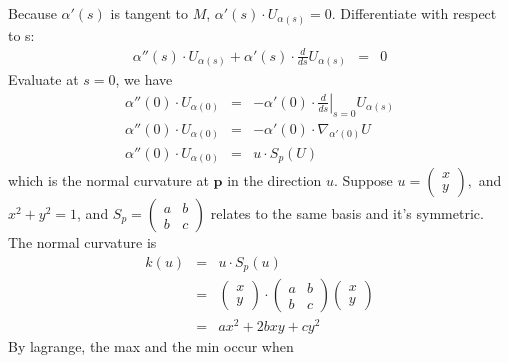 \documentclass{article}
\begin{document}
Because $\alpha' (s)$ is tangent to $M$, $\alpha' (s) \cdot U_{\alpha (s)} =
0$. Differentiate with respect to s:
\begin{eqnarray*}
  \alpha'' (s) \cdot U_{\alpha (s)} + \alpha' (s) \cdot \frac{d}{d s}
  U_{\alpha (s)} & = & 0
\end{eqnarray*}
Evaluate at $s = 0$, we have
\begin{eqnarray}
  \alpha'' (0) \cdot U_{\alpha (0)} & = & - \alpha' (0) \cdot \left.
  \frac{d}{d s} \right|_{s = 0} U_{\alpha (s)} \nonumber\\
  \alpha'' (0) \cdot U_{\alpha (0)} & = & - \alpha' (0) \cdot \nabla_{\alpha'
  (0)} U \nonumber\\
  \alpha'' (0) \cdot U_{\alpha (0)} & = & u \cdot S_p (U) 
\end{eqnarray}
which is the normal curvature at $\mathbf{p}$ in the direction $u$. Suppose $u
= \left(\begin{array}{c}
  x\\
  y
\end{array}\right),$ and $x^2 + y^2 = 1$, and $S_p = \left(\begin{array}{cc}
  a & b\\
  b & c
\end{array}\right)$ relates to the same basis and it's symmetric. The normal
curvature is
\begin{eqnarray*}
  k (u) & = & u \cdot S_p (u)\\
  & = & \left(\begin{array}{c}
    x\\
    y
  \end{array}\right) \cdot \left(\begin{array}{cc}
    a & b\\
    b & c
  \end{array}\right) \left(\begin{array}{c}
    x\\
    y
  \end{array}\right)\\
  & = & a x^2 + 2 b x y + c y^2
\end{eqnarray*}
By lagrange, the max and the min occur when
\end{document}
